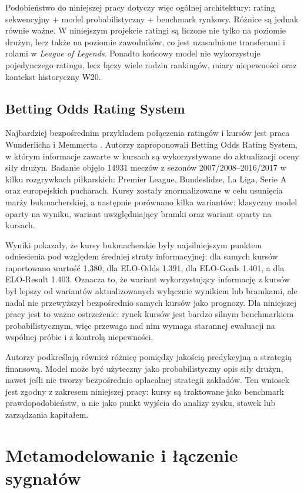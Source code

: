 Podobieństwo do niniejszej pracy dotyczy więc ogólnej architektury: rating sekwencyjny + model
probabilistyczny + benchmark rynkowy. Różnice są jednak równie ważne. W niniejszym projekcie ratingi
są liczone nie tylko na poziomie drużyn, lecz także na poziomie zawodników, co jest uzasadnione
transferami i rolami w \textit{League of Legends}. Ponadto końcowy model nie wykorzystuje
pojedynczego ratingu, lecz łączy wiele rodzin rankingów, miary niepewności oraz kontekst historyczny
W20.

\subsection{Betting Odds Rating System}

Najbardziej bezpośrednim przykładem połączenia ratingów i kursów jest praca Wunderlicha i Memmerta
\parencite{wunderlich2018bettingOddsRating}. Autorzy zaproponowali Betting Odds Rating System, w
którym informacje zawarte w kursach są wykorzystywane do aktualizacji oceny siły drużyn. Badanie
objęło 14931 meczów z sezonów 2007/2008--2016/2017 w kilku rozgrywkach piłkarskich: Premier League,
Bundeslidze, La Liga, Serie A oraz europejskich pucharach. Kursy zostały znormalizowane w celu
usunięcia marży bukmacherskiej, a następnie porównano kilka wariantów: klasyczny model oparty na
wyniku, wariant uwzględniający bramki oraz wariant oparty na kursach.

Wyniki pokazały, że kursy bukmacherskie były najsilniejszym punktem odniesienia pod względem
średniej straty informacyjnej: dla samych kursów raportowano wartość 1.380, dla ELO-Odds 1.391, dla
ELO-Goals 1.401, a dla ELO-Result 1.403. Oznacza to, że wariant wykorzystujący informację z kursów
był lepszy od wariantów aktualizowanych wyłącznie wynikiem lub bramkami, ale nadal nie przewyższył
bezpośrednio samych kursów jako prognozy. Dla niniejszej pracy jest to ważne ostrzeżenie: rynek
kursów jest bardzo silnym benchmarkiem probabilistycznym, więc przewaga nad nim wymaga starannej
ewaluacji na wspólnej próbie i z kontrolą niepewności.

Autorzy podkreślają również różnicę pomiędzy jakością predykcyjną a strategią finansową. Model może
być użyteczny jako probabilistyczny opis siły drużyn, nawet jeśli nie tworzy bezpośrednio opłacalnej
strategii zakładów. Ten wniosek jest zgodny z zakresem niniejszej pracy: kursy są traktowane jako
benchmark prawdopodobieństw, a nie jako punkt wyjścia do analizy zysku, stawek lub zarządzania
kapitałem.

\section{Metamodelowanie i łączenie sygnałów}

